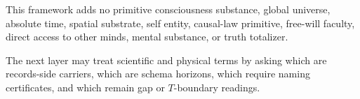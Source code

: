 \begin{corollary}
\label{cor:philosophy-no-added-phenomenological-primitives}
This framework adds no primitive consciousness substance, global
universe, absolute time, spatial substrate, self entity, causal-law
primitive, free-will faculty, direct access to other minds, mental
substance, or truth totalizer.
\end{corollary}

\begin{corollary}
\label{cor:philosophy-passage-to-scientific-objects}
The next layer may treat scientific and physical terms by asking which
are records-side carriers, which are schema horizons, which require
naming certificates, and which remain gap or \(T\)-boundary readings.
\end{corollary}
